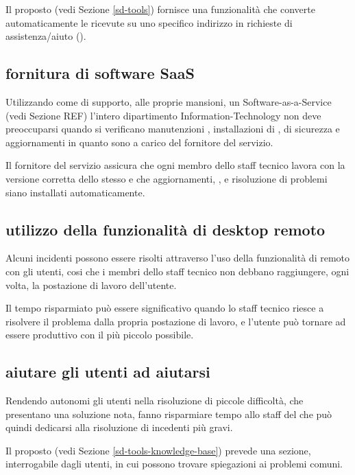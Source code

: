 Il  proposto (vedi Sezione \ref{sd-tools}) fornisce una funzionalità che converte automaticamente le  ricevute su uno specifico indirizzo in richieste di assistenza/aiuto ().

\subsection[Fornitura di software SaaS]{fornitura di software SaaS}
\label{sd-users-experience-saas}
Utilizzando come  di supporto, alle proprie mansioni, un \ac{Software-as-a-Service} (vedi Sezione REF) l'intero dipartimento \acs{Information-Technology} non deve preoccuparsi quando si verificano manutenzioni , installazioni di ,  di sicurezza e aggiornamenti  in quanto sono a carico del fornitore del servizio.

Il fornitore del servizio  assicura che ogni membro dello staff tecnico lavora con la versione corretta dello stesso e che aggiornamenti, , e risoluzione di problemi siano installati automaticamente.

\subsection[Utilizzo della funzionalità di desktop remoto]{utilizzo della funzionalità di desktop remoto}
\label{sd-users-experience-remote-desktop}
Alcuni incidenti possono essere risolti attraverso l'uso della funzionalità di  remoto con gli utenti, cosi che i membri dello staff tecnico non debbano raggiungere, ogni volta, la postazione di lavoro dell'utente.

Il tempo risparmiato può essere significativo quando lo staff tecnico riesce a risolvere il problema dalla propria postazione di lavoro, e l'utente può tornare ad essere produttivo con il più piccolo  possibile.

\subsection[Aiutare gli utenti ad aiutarsi]{aiutare gli utenti ad aiutarsi}
\label{sd-user-experience-help}
Rendendo autonomi gli utenti nella risoluzione di piccole difficoltà, che presentano una soluzione nota, fanno risparmiare tempo allo staff del  che può quindi dedicarsi alla risoluzione di incedenti più gravi.

Il  proposto (vedi Sezione \ref{sd-tools-knowledge-base}) prevede una sezione, interrogabile dagli utenti, in cui possono trovare spiegazioni ai problemi comuni.